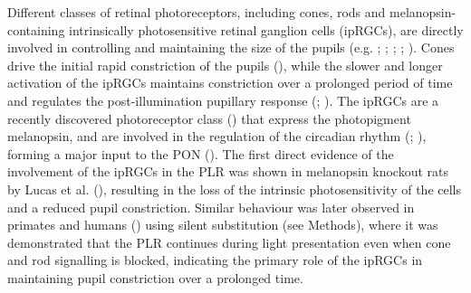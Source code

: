 \documentclass[
]{article}
\begin{document}
Different classes of retinal photoreceptors, including cones, rods and melanopsin-containing intrinsically photosensitive retinal ganglion cells (ipRGCs), are directly involved in controlling and maintaining the size of the pupils (e.g. ; ; ; ; ). Cones drive the initial rapid constriction of the pupils (), while the slower and longer activation of the ipRGCs maintains constriction over a prolonged period of time and regulates the post-illumination pupillary response (; ). The ipRGCs are a recently discovered photoreceptor class () that express the photopigment melanopsin, and are involved in the regulation of the circadian rhythm (; ), forming a major input to the PON (). The first direct evidence of the involvement of the ipRGCs in the PLR was shown in melanopsin knockout rats by Lucas et al. (), resulting in the loss of the intrinsic photosensitivity of the cells and a reduced pupil constriction. Similar behaviour was later observed in primates and humans () using silent substitution (see Methods), where it was demonstrated that the PLR continues during light presentation even when cone and rod signalling is blocked, indicating the primary role of the ipRGCs in maintaining pupil constriction over a prolonged time.
\end{document}
